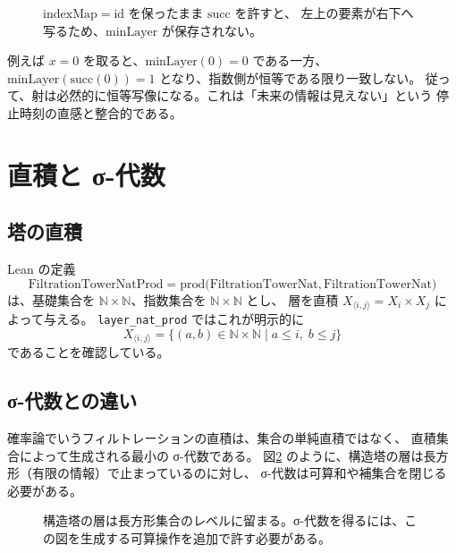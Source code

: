 \documentclass[a4paper,11pt]{ltjsarticle}
\begin{document}
\begin{figure}[htbp]
  \centering
  \caption{\(\mathrm{indexMap}=\mathrm{id}\) を保ったまま \(\mathrm{succ}\) を許すと、
  左上の要素が右下へ写るため、\(\mathrm{minLayer}\) が保存されない。}
  \label{fig:succ}
\end{figure}

例えば \(x=0\) を取ると、\(\mathrm{minLayer}(0)=0\) である一方、
\(\mathrm{minLayer}(\mathrm{succ}(0))=1\) となり、指数側が恒等である限り一致しない。
従って、射は必然的に恒等写像になる。これは「未来の情報は見えない」という
停止時刻の直感と整合的である。

\section{直積と σ-代数}

\subsection{塔の直積}

Lean の定義
\[
  \mathrm{FiltrationTowerNatProd} = \mathrm{prod}\bigl(\mathrm{FiltrationTowerNat},
  \mathrm{FiltrationTowerNat}\bigr)
\]
は、基礎集合を \(\mathbb{N}\times\mathbb{N}\)、指数集合を \(\mathbb{N}\times\mathbb{N}\) とし、
層を直積 \(X_{\langle i,j\rangle} = X_i\times X_j\) によって与える。
\texttt{layer\_nat\_prod} ではこれが明示的に
\[
  X_{\langle i,j\rangle} = \{(a,b)\in\mathbb{N}\times\mathbb{N}\mid
  a\leq i,\; b\leq j\}
\]
であることを確認している。

\subsection{σ-代数との違い}

確率論でいうフィルトレーションの直積は、集合の単純直積ではなく、
直積集合によって生成される最小の σ-代数である。
図\ref{fig:rectangle} のように、構造塔の層は長方形（有限の情報）で止まっているのに対し、
σ-代数は可算和や補集合を閉じる必要がある。

\begin{figure}[htbp]
  \centering
  \caption{構造塔の層は長方形集合のレベルに留まる。σ-代数を得るには、この図を生成する可算操作を追加で許す必要がある。}
  \label{fig:rectangle}
\end{figure}
\end{document}

